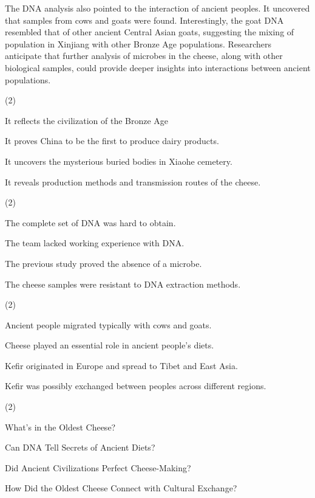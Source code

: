 \documentclass{英语试卷}
\begin{document}
\par The DNA analysis also pointed to the interaction of ancient peoples. It uncovered that samples from cows and goats were found. Interestingly, the goat DNA resembled that of other ancient Central Asian goats, suggesting the mixing of population in Xinjiang with other Bronze Age populations. Researchers anticipate that further analysis of microbes in the cheese, along with other biological samples, could provide deeper insights into interactions between ancient populations.\par
{}
\begin{choices}(2)
  \item It reflects the civilization of the Bronze Age
  \item It proves China to be the first to produce dairy products.
  \item It uncovers the mysterious buried bodies in Xiaohe cemetery.
  \item It reveals production methods and transmission routes of the cheese.
\end{choices}
\begin{choices}(2)
  \item The complete set of DNA was hard to obtain.
  \item The team lacked working experience with DNA.
  \item The previous study proved the absence of a microbe.
  \item The cheese samples were resistant to DNA extraction methods.
\end{choices}
\begin{choices}(2)
  \item Ancient people migrated typically with cows and goats.
  \item Cheese played an essential role in ancient people's diets.
  \item Kefir originated in Europe and spread to Tibet and East Asia.
  \item Kefir was possibly exchanged between peoples across different regions.
\end{choices}
\begin{choices}(2)
  \item What's in the Oldest Cheese?
  \item Can DNA Tell Secrets of Ancient Diets?
  \item Did Ancient Civilizations Perfect Cheese-Making?
  \item How Did the Oldest Cheese Connect with Cultural Exchange?
\end{choices}
\end{document}
